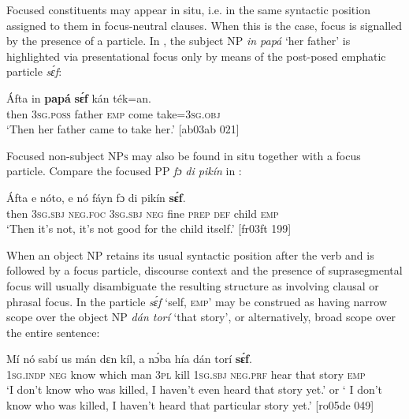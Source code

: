 Focused constituents may appear in situ, i.e. in the same syntactic position assigned to them in focus-neutral clauses. When this is the case, focus is signalled by the presence of a particle. In , the subject NP \textit{in papá} ‘her father’ is highlighted via presentational focus{\fff} only by means of the post-posed emphatic particle \textit{sɛ́f}: 


\ea%
    \label{ex:key:683}
    \gll \'{A}fta    in    \textbf{papá}  \textbf{sɛ́f}  kán    ték=an.\\
then  \textsc{3sg.poss}  father  \textsc{emp}  come  take=\textsc{3sg.obj}\\

\glt ‘Then her father came to take her.’ [ab03ab 021]
\z

Focused non-subject \textsc{NPs} may also be found in situ together with a focus particle. Compare the focused PP \textit{fɔ} \textit{di pikín} in : 


\ea%
    \label{ex:key:684}
    \gll \'{A}fta    e    nóto,  e    nó  fáyn    fɔ  di  pikín  \textbf{sɛ́f}.\\
then  \textsc{3sg.sbj}  \textsc{neg}.\textsc{foc}  \textsc{3sg.sbj}  \textsc{neg}  fine    \textsc{prep}  \textsc{def}  child  \textsc{emp}\\

\glt ‘Then it’s not, it’s not good for the child itself.’ [fr03ft 199]
\z

When an object NP retains its usual syntactic position after the verb and is followed by a focus particle, discourse context and the presence of suprasegmental focus will usually disambiguate the resulting structure as involving clausal or phrasal focus. In  the particle \textit{sɛ́f} ‘self, \textsc{emp}’ may be construed as having narrow scope over the object NP \textit{dán torí} ‘that story’, or alternatively, broad scope over the entire sentence: 


\ea%
    \label{ex:key:685}
    \gll Mí    nó  sabí    us    mán    dɛn  kíl,  a    nɔ́ba
hía    dán    torí    \textbf{sɛ́f}.\\
\textsc{1sg.indp}  \textsc{neg}  know  which  man    \textsc{3pl}  kill  \textsc{1sg.sbj}  \textsc{neg}.\textsc{prf}
hear     that  story  \textsc{emp}\\

\glt ‘I don’t know who was killed, I haven’t even heard that story yet.’ 
or ‘ I don’t know who was killed, I haven’t heard that particular 
story yet.’ [ro05de 049]
\z

